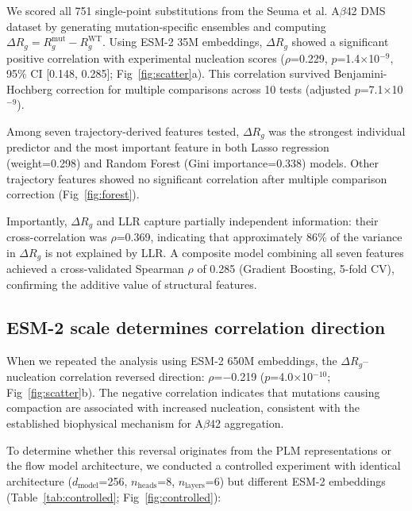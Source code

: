 \documentclass[10pt,letterpaper]{article}
\begin{document}
We scored all 751 single-point substitutions from the Seuma et al. A$\beta$42 DMS dataset \cite{seuma2022} by generating mutation-specific ensembles and computing $\Delta R_g = R_g^{\text{mut}} - R_g^{\text{WT}}$. Using ESM-2 35M embeddings, $\Delta R_g$ showed a significant positive correlation with experimental nucleation scores ($\rho$=0.229, $p$=1.4$\times$10$^{-9}$, 95\% CI [0.148, 0.285]; Fig~\ref{fig:scatter}a). This correlation survived Benjamini-Hochberg correction for multiple comparisons across 10 tests (adjusted $p$=7.1$\times$10$^{-9}$).

Among seven trajectory-derived features tested, $\Delta R_g$ was the strongest individual predictor and the most important feature in both Lasso regression (weight=0.298) and Random Forest (Gini importance=0.338) models. Other trajectory features showed no significant correlation after multiple comparison correction (Fig~\ref{fig:forest}).

Importantly, $\Delta R_g$ and LLR capture partially independent information: their cross-correlation was $\rho$=0.369, indicating that approximately 86\% of the variance in $\Delta R_g$ is not explained by LLR. A composite model combining all seven features achieved a cross-validated Spearman $\rho$ of 0.285 (Gradient Boosting, 5-fold CV), confirming the additive value of structural features.

\subsection*{ESM-2 scale determines correlation direction}

When we repeated the analysis using ESM-2 650M embeddings, the $\Delta R_g$--nucleation correlation reversed direction: $\rho$=$-$0.219 ($p$=4.0$\times$10$^{-10}$; Fig~\ref{fig:scatter}b). The negative correlation indicates that mutations causing compaction are associated with increased nucleation, consistent with the established biophysical mechanism for A$\beta$42 aggregation.

To determine whether this reversal originates from the PLM representations or the flow model architecture, we conducted a controlled experiment with identical architecture ($d_{\text{model}}$=256, $n_{\text{heads}}$=8, $n_{\text{layers}}$=6) but different ESM-2 embeddings (Table~\ref{tab:controlled}; Fig~\ref{fig:controlled}):
\end{document}
